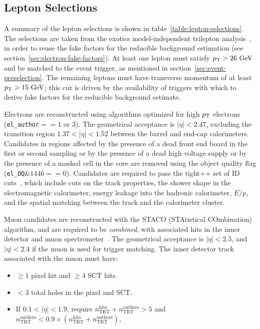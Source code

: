 \subsection{Lepton Selections}\label{sec:lepton-selections}
A summary of the lepton selections is shown in table~\ref{table:lepton-selections}. The selections are taken from the exotics model-independent trilepton analysis~\cite{DeViveiros:1670929}, in order to reuse the fake factors for the reducible background estimation (see section~\ref{sec:electron-fake-factors}). At least one lepton must satisfy $p_{\text{T}}>26~\mbox{GeV}$ and be matched to the event trigger, as mentioned in section~\ref{sec:event-preselection}. The remaining leptons must have transverse momentum of at least $p_{\text{T}}>15~\mbox{GeV}$; this cut is driven by the availability of triggers with which to derive fake factors for the reducible background estimate. 

Electrons are reconstructed using algorithms optimized for high $p_{\text{T}}$ electrons (\verb.el_author.$==1$ or $3$). The geometrical acceptance is $|\eta|<2.47$, excluding the transition region $1.37<|\eta|<1.52$ between the barrel and end-cap calorimeters. Candidates in regions affected by the presence of a dead front end board in the first or second sampling or by the presence of a dead high voltage supply or by the presence of a masked cell in the core are removed using the object quality flag (\verb.el_OQ.$\&1446==0$). Candidates are required to pass the tight++ set of ID cuts~\cite{Aad:2014fxa}, which include cuts on the track properties, the shower shape in the electromagnetic calorimeter, energy leakage into the hadronic calorimeter, $E/p$, and the spatial matching between the track and the calorimeter cluster. 

Muon candidates are reconstructed with the STACO (STAtistical COmbination) algorithm, and are required to be \emph{combined}, with associated hits in the inner detector and muon spectrometer~\cite{ATLAS-CONF-2013-088}. The geometrical acceptance is $|\eta|<2.5$, and $|\eta|<2.4$ if the muon is used for trigger matching. The inner detector track associated with the muon must have:
\begin{itemize}
  \item $\geq1$ pixel hit and $\geq4$ SCT hits.
  \item $<3$ total holes in the pixel and SCT. 
  \item If $0.1 < |\eta| < 1.9$, require $n_{\mathrm{TRT}}^{\mathrm{hits}}+n_{\mathrm{TRT}}^{\mathrm{outliers}} > 5$ and $n_{\mathrm{TRT}}^{\mathrm{outliers}} < 0.9 \times (n_{\mathrm{TRT}}^{\mathrm{hits}}+n_{\mathrm{TRT}}^{\mathrm{outliers}})$,
\end{itemize}

